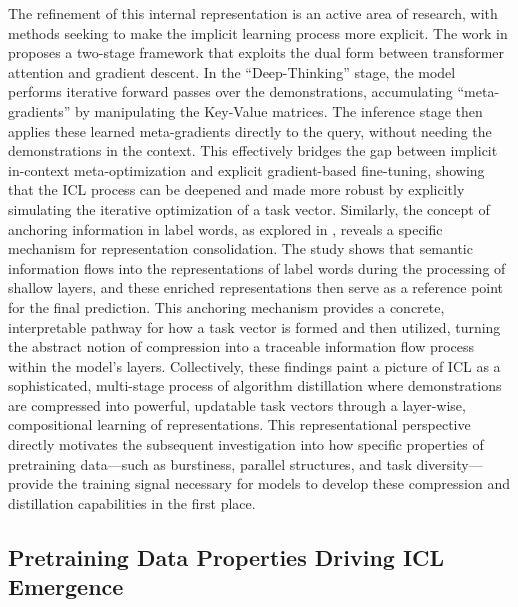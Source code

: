 \documentclass[11pt]{article}
\begin{document}
The refinement of this internal representation is an active area of research, with methods seeking to make the implicit learning process more explicit. The work in \cite{ref45} proposes a two-stage framework that exploits the dual form between transformer attention and gradient descent. In the ``Deep-Thinking'' stage, the model performs iterative forward passes over the demonstrations, accumulating ``meta-gradients'' by manipulating the Key-Value matrices. The inference stage then applies these learned meta-gradients directly to the query, without needing the demonstrations in the context. This effectively bridges the gap between implicit in-context meta-optimization and explicit gradient-based fine-tuning, showing that the ICL process can be deepened and made more robust by explicitly simulating the iterative optimization of a task vector. Similarly, the concept of anchoring information in label words, as explored in \cite{ref66}, reveals a specific mechanism for representation consolidation. The study shows that semantic information flows into the representations of label words during the processing of shallow layers, and these enriched representations then serve as a reference point for the final prediction. This anchoring mechanism provides a concrete, interpretable pathway for how a task vector is formed and then utilized, turning the abstract notion of compression into a traceable information flow process within the model's layers. Collectively, these findings paint a picture of ICL as a sophisticated, multi-stage process of algorithm distillation where demonstrations are compressed into powerful, updatable task vectors through a layer-wise, compositional learning of representations. This representational perspective directly motivates the subsequent investigation into how specific properties of pretraining data---such as burstiness, parallel structures, and task diversity---provide the training signal necessary for models to develop these compression and distillation capabilities in the first place.

\subsection{Pretraining Data Properties Driving ICL Emergence}
\end{document}
